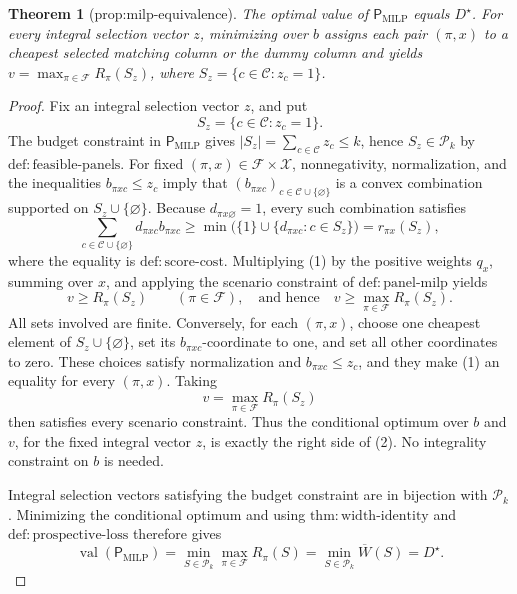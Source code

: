 \documentclass{article}
\newtheorem{theorem}{Theorem}
\begin{document}
\begin{theorem}[prop:milp-equivalence]\label{prop:milp-equivalence}
The optimal value of \(\mathsf P_{\mathrm{MILP}}\) equals \(D^{\star}\). For every integral selection vector \(z\), minimizing over \(b\) assigns each pair \((\pi,x)\) to a cheapest selected matching column or the dummy column and yields \(v=\max_{\pi\in\mathcal F}R_{\pi}(S_z)\), where \(S_z=\{c\in\mathcal C:z_c=1\}\).
\end{theorem}
\begin{proof}
Fix an integral selection vector \(z\), and put
\[
S_z=\{c\in\mathcal C:z_c=1\}.
\]
The budget constraint in \(\mathsf P_{\mathrm{MILP}}\) gives
\(|S_z|=\sum_{c\in\mathcal C}z_c\leq k\), hence
\(S_z\in\mathcal P_k\) by \(\mathrm{def{:}feasible\text{-}panels}\).
For fixed \((\pi,x)\in\mathcal F\times\mathcal X\), nonnegativity,
normalization, and the inequalities \(b_{\pi xc}\leq z_c\) imply that
\((b_{\pi xc})_{c\in\mathcal C\cup\{\varnothing\}}\) is a convex
combination supported on \(S_z\cup\{\varnothing\}\).  Because
\(d_{\pi x\varnothing}=1\), every such combination satisfies
\[
\sum_{c\in\mathcal C\cup\{\varnothing\}}
d_{\pi xc}b_{\pi xc}
\geq
\min\bigl(\{1\}\cup\{d_{\pi xc}:c\in S_z\}\bigr)
=r_{\pi x}(S_z),                                                    \tag{1}
\]
where the equality is \(\mathrm{def{:}score\text{-}cost}\).  Multiplying
(1) by the positive weights \(q_x\), summing over \(x\), and applying the
scenario constraint of \(\mathrm{def{:}panel\text{-}milp}\) yields
\[
v\geq R_\pi(S_z)\qquad(\pi\in\mathcal F),
\quad\text{and hence}\quad
v\geq\max_{\pi\in\mathcal F}R_\pi(S_z).                              \tag{2}
\]
All sets involved are finite.  Conversely, for each \((\pi,x)\), choose
one cheapest element of \(S_z\cup\{\varnothing\}\), set its
\(b_{\pi xc}\)-coordinate to one, and set all other coordinates to zero.
These choices satisfy normalization and \(b_{\pi xc}\leq z_c\), and they
make (1) an equality for every \((\pi,x)\).  Taking
\[
v=\max_{\pi\in\mathcal F}R_\pi(S_z)
\]
then satisfies every scenario constraint.  Thus the conditional optimum
over \(b\) and \(v\), for the fixed integral vector \(z\), is exactly the
right side of (2).  No integrality constraint on \(b\) is needed.

Integral selection vectors satisfying the budget constraint are in
bijection with \(\mathcal P_k\).  Minimizing the conditional optimum and
using \(\mathrm{thm{:}width\text{-}identity}\) and
\(\mathrm{def{:}prospective\text{-}loss}\) therefore gives
\[
\operatorname{val}(\mathsf P_{\mathrm{MILP}})
=\min_{S\in\mathcal P_k}\max_{\pi\in\mathcal F}R_\pi(S)
=\min_{S\in\mathcal P_k}\overline W(S)
=D^\star.
\]
\end{proof}
\end{document}
